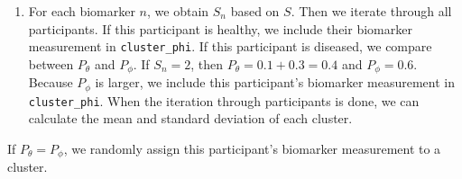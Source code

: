 \documentclass[
  letterpaper,
  DIV=11,
  numbers=noendperiod]{scrreprt}
\providecommand{\tightlist}{%
  \setlength{\itemsep}{0pt}\setlength{\parskip}{0pt}}\usepackage{longtable,booktabs,array}
\begin{document}
\begin{enumerate}
\def\labelenumi{\arabic{enumi}.}
\setcounter{enumi}{1}
\tightlist
\item
  For each biomarker \(n\), we obtain \(S_n\) based on \(S\). Then we
  iterate through all participants. If this participant is healthy, we
  include their biomarker measurement in \texttt{cluster\_phi}. If this
  participant is diseased, we compare between \(P_{\theta}\) and
  \(P_{\phi}\). If \(S_n = 2\), then \(P_{\theta} = 0.1 + 0.3 = 0.4\)
  and \(P_{\phi} = 0.6\). Because \(P_{\phi}\) is larger, we include
  this participant's biomarker measurement in \texttt{cluster\_phi}.
  When the iteration through participants is done, we can calculate the
  mean and standard deviation of each cluster.
\end{enumerate}

\begin{tcolorbox}[enhanced jigsaw, bottomrule=.15mm, colback=white, bottomtitle=1mm, titlerule=0mm, arc=.35mm, breakable, rightrule=.15mm, opacityback=0, leftrule=.75mm, opacitybacktitle=0.6, colframe=quarto-callout-tip-color-frame, coltitle=black, toptitle=1mm, colbacktitle=quarto-callout-tip-color!10!white, title=\textcolor{quarto-callout-tip-color}{\faLightbulb}\hspace{0.5em}{Tip}, left=2mm, toprule=.15mm]

If \(P_{\theta} =  P_{\phi}\), we randomly assign this participant's
biomarker measurement to a cluster.

\end{tcolorbox}
\end{document}
